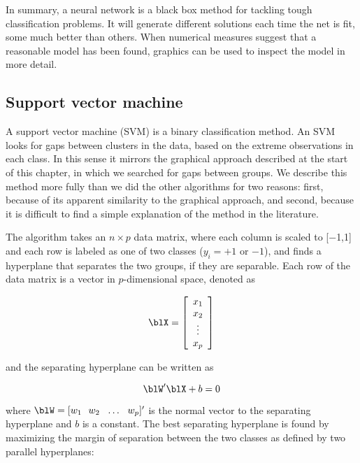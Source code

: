 In summary, a neural network is a black box method for tackling tough
classification problems. It will generate different solutions each
time the net is fit, some much better than others. When numerical
measures suggest that a reasonable model has been found, graphics can
be used to inspect the model in more detail.

\subsection{Support vector machine}


A support vector machine (SVM) \cite{Va99} is a binary classification
method.  An SVM looks for gaps between clusters in the data, based on the
extreme observations in each class. In this sense it mirrors the
graphical approach described at the start of this chapter, in which we
searched for gaps between groups. We describe this method more fully
than we did the other algorithms for two reasons: first, because of
its apparent similarity to the graphical approach, and second, because
it is difficult to find a simple explanation of the method in the
literature.

The algorithm takes an $n \times p$ data matrix, where each column is
scaled to [$-$1,1] and each row is labeled as one of two classes
($y_i=+1$ or $-1$), and finds a hyperplane that separates the two
groups, if they are separable. Each row of the data matrix is a vector
in $p$-dimensional space, denoted as


\[
\blX=\left[ \begin{array}{c}
  x_1 \\ x_2 \\ \vdots \\ x_p \end{array} \right]
\]

\noindent and the separating hyperplane can be written as

\[
\blW'\blX + b = 0
\]

\noindent where $\blW = [ w_1~~ w_2 ~~ \dots ~~ w_p]'$ is the normal
vector to the separating hyperplane and $b$ is a constant.  The best
separating hyperplane is found by maximizing the margin of separation
between the two classes as defined by two parallel hyperplanes:

